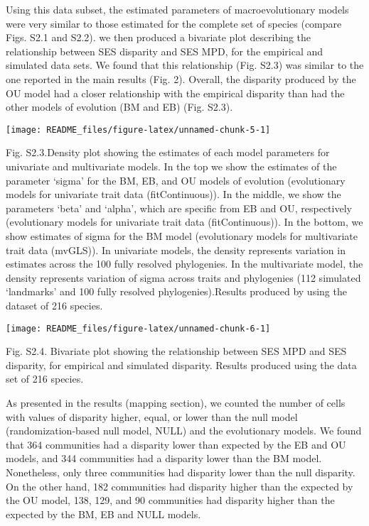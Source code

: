 \documentclass[
]{article}
\begin{document}
Using this data subset, the estimated parameters of macroevolutionary
models were very similar to those estimated for the complete set of
species (compare Figs. S2.1 and S2.2). we then produced a bivariate plot
describing the relationship between SES disparity and SES MPD, for the
empirical and simulated data sets. We found that this relationship (Fig.
S2.3) was similar to the one reported in the main results (Fig. 2).
Overall, the disparity produced by the OU model had a closer
relationship with the empirical disparity than had the other models of
evolution (BM and EB) (Fig. S2.3).

\begin{center}\texttt{[image: README\_files/figure-latex/unnamed-chunk-5-1]} \end{center}

Fig. S2.3.Density plot showing the estimates of each model parameters
for univariate and multivariate models. In the top we show the estimates
of the parameter `sigma' for the BM, EB, and OU models of evolution
(evolutionary models for univariate trait data (fitContinuous)). In the
middle, we show the parameters `beta' and `alpha', which are specific
from EB and OU, respectively (evolutionary models for univariate trait
data (fitContinuous)). In the bottom, we show estimates of sigma for the
BM model (evolutionary models for multivariate trait data (mvGLS)). In
univariate models, the density represents variation in estimates across
the 100 fully resolved phylogenies. In the multivariate model, the
density represents variation of sigma across traits and phylogenies (112
simulated `landmarks' and 100 fully resolved phylogenies).Results
produced by using the dataset of 216 species.

\begin{center}\texttt{[image: README\_files/figure-latex/unnamed-chunk-6-1]} \end{center}

Fig. S2.4. Bivariate plot showing the relationship between SES MPD and
SES disparity, for empirical and simulated disparity. Results produced
using the data set of 216 species.

As presented in the results (mapping section), we counted the number of
cells with values of disparity higher, equal, or lower than the null
model (randomization-based null model, NULL) and the evolutionary
models. We found that 364 communities had a disparity lower than
expected by the EB and OU models, and 344 communities had a disparity
lower than the BM model. Nonetheless, only three communities had
disparity lower than the null disparity. On the other hand, 182
communities had disparity higher than the expected by the OU model, 138,
129, and 90 communities had disparity higher than the expected by the
BM, EB and NULL models.
\end{document}
